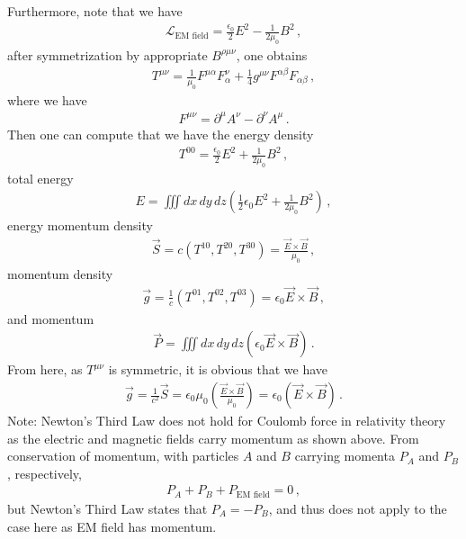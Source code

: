 \documentclass[11pt, onesided]{book}
\theoremstyle{break}
\theoremstyle{break}
\newcommand{\pd}{\partial}
\newcommand{\note}{\color{red}Note: \color{black}}
\begin{document}
Furthermore, note that we have
\begin{align*}
\mathcal{L}_{\text{EM field}} = \frac{\epsilon_0}{2}E^2 - \frac{1}{2\mu_0}B^2\,,
\end{align*}
after symmetrization by appropriate $B^{\rho \mu\nu}$, one obtains
\begin{align*}
T^{\mu\nu} = \frac{1}{\mu_0}F^{\mu\alpha}F^{\nu}_\alpha + \frac{1}{4}g^{\mu\nu}F^{\alpha\beta}F_{\alpha\beta}\,,
\end{align*}
where we have
\begin{align*}
F^{\mu\nu} = \pd^\mu A^\nu - \pd^\nu A^\mu\,.
\end{align*}
Then one can compute that we have the energy density
\begin{align*}
T^{00} = \frac{\epsilon_0}{2}E^2 + \frac{1}{2\mu_0}B^2\,,
\end{align*}
total energy
\begin{align*}
E = \iiint dx\,dy\,dz \left( \frac{1}{2}\epsilon_0 E^2 + \frac{1}{2\mu_0}B^2\right)\,,
\end{align*}
energy momentum density
\begin{align*}
\vec{S} = c(T^{10}, T^{20}, T^{30}) = \frac{\vec{E} \times \vec{B}}{\mu_0}\,,
\end{align*}
momentum density
\begin{align*}
\vec{g} = \frac{1}{c}(T^{01}, T^{02}, T^{03}) = \epsilon_0 \vec{E}\times \vec{B}\,,
\end{align*}
and momentum
\begin{align*}
\vec{P} = \iiint dx\,dy\,dz \left(\epsilon_0 \vec{E}\times \vec{B}\right)\,.
\end{align*}
From here, as $T^{\mu\nu}$ is symmetric, it is obvious that we have
\begin{align*}
\vec{g} = \frac{1}{c^2}\vec{S} = \epsilon_0\mu_0\left( \frac{\vec{E}\times \vec{B}}{\mu_0}\right) = \epsilon_0 \left( \vec{E}\times \vec{B}\right)\,.
\end{align*}
\note Newton's Third Law does not hold for Coulomb force in relativity theory as the electric and magnetic fields carry momentum as shown above. From conservation of momentum, with particles $A$ and $B$ carrying momenta $P_A$ and $P_B$, respectively,
\begin{align*}
P_A + P_B + P_{\text{EM field}} = 0\,,
\end{align*}
but Newton's Third Law states that $P_A = - P_B$, and thus does not apply to the case here as EM field has momentum.\\
\end{document}
